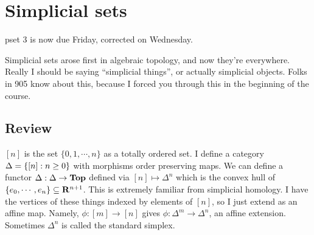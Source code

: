 \section{Simplicial sets}
pset 3 is now due Friday, corrected on Wednesday.

Simplicial sets arose first in algebraic topology, and now they're everywhere.
Really I should be saying ``simplicial things'', or actually simplicial objects.
Folks in 905 know about this, because I forced you through this in the beginning of the course.
\subsection{Review}
$[n]$ is the set $\{0,1,\cdots,n\}$ as a totally ordered set.
I define a category ${\Delta} = \{[n]:n\geq 0\}$ with morphisms order preserving maps.
We can define a functor $\Delta:{\Delta}\to\mathbf{Top}$ defined via $[n]\mapsto\Delta^n$ which is the convex hull of $\{e_0,\cdots,e_n\}\subseteq \mathbf R^{n+1}$.
This is extremely familiar from simplicial homology.
I have the vertices of these things indexed by elements of $[n]$, so I just extend as an affine map. Namely, $\phi:[m]\to [n]$ gives $\phi:\Delta^m\to\Delta^n$, an affine extension. 
Sometimes $\Delta^n$ is called the standard simplex.

